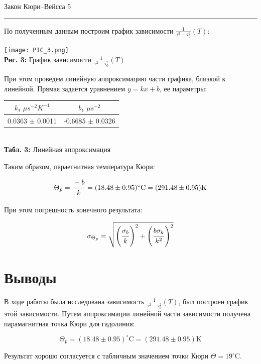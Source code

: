 \documentclass[12pt,a4paper]{scrartcl}
\begin{document}
	\newpage
	
	
	\begin{flushleft}
		\footnotesize{Закон Кюри–Вейсса} \hspace{\fill} \footnotesize{5}
		\\[-0.3cm]\noindent\rule{\textwidth}{0.3pt}
	\end{flushleft}
	
	По полученным данным построим график зависимости $\frac{1}{\tau^2 - \tau_0^2}(T)$:
	
	\begin{center}
		\texttt{[image: PIC\_3.png]}
		\\\textbf{Рис. 3:} График зависимости $\frac{1}{\tau^2 - \tau_0^2}(T)$
	\end{center}
	
	При этом проведем линейную аппроксимацию  части графика, близкой к линейной. Прямая задается уравнением $y = kx + b$, ее параметры:
	
	\begin{center}
		\begin{tabular}{|c|c|}
			\hline
			$k$, $\mu s^{-2} K^{-1}$ & $b$, $\mu s^{-2}$
			\\\hline
			0.0363 $\pm$ 0.0011 & -0.6685 $\pm$ 0.0326
			\\\hline
		\end{tabular}
		\\\textbf{Табл. 3:} Линейная аппроксимация
	\end{center}

	Таким образом, параегнитная температура Кюри:
	
	$$\Theta_p = \dfrac{\strut -b}{\strut k} = (18.48 \pm 0.95) ^\circ \mathrm{C} = (291.48 \pm 0.95) \mathrm{K}$$
	
	При этом погрешность конечного результата:
	
	$$\sigma_{\Theta_p} = \sqrt{\left(\dfrac{\strut \sigma_b}{\strut k}\right)^2 + \left(\dfrac{\strut b\sigma_k}{\strut k^2}\right)^2}$$
	
	\section{Выводы}
	
	В ходе работы была исследована зависимость $\frac{1}{\tau^2 - \tau_0^2}(T)$, был построен график этой зависимости. Путем аппроксимации линейной части зависимости получена парамагнитная точка Кюри для гадолиния:
	
	$$\Theta_p = (18.48 \pm 0.95) ^\circ \mathrm{C} = (291.48 \pm 0.95) \mathrm{K}$$
	
	Результат хорошо согласуется с табличным значением точки Кюри $\Theta = 19 ^\circ \mathrm{C}$.
	
\end{document}
